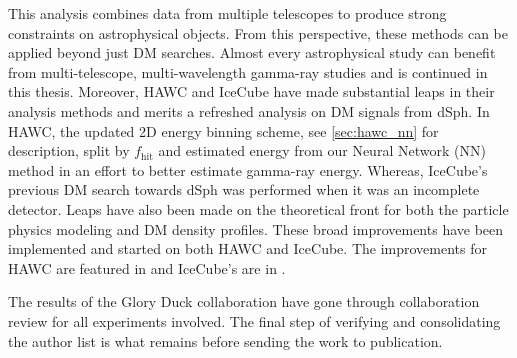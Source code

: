 This analysis combines data from multiple telescopes to produce strong constraints on astrophysical objects.
From this perspective, these methods can be applied beyond just DM searches.
Almost every astrophysical study can benefit from multi-telescope, multi-wavelength gamma-ray studies and is continued in this thesis.
Moreover, HAWC and IceCube have made substantial leaps in their analysis methods and merits a refreshed analysis on DM signals from dSph.
In HAWC, the updated 2D energy binning scheme, see \cref{sec:hawc_nn} for description, split by $f_\mathrm{hit}$ and estimated energy from our Neural Network (NN) method in an effort to better estimate gamma-ray energy.
Whereas, IceCube's previous DM search towards dSph was performed when it was an incomplete detector.
Leaps have also been made on the theoretical front for both the particle physics modeling and DM density profiles.
These broad improvements have been implemented and started on both HAWC and IceCube.
The improvements for HAWC are featured in  and IceCube's are in .

The results of the Glory Duck collaboration have gone through collaboration review for all experiments involved.
The final step of verifying and consolidating the author list is what remains before sending the work to publication.